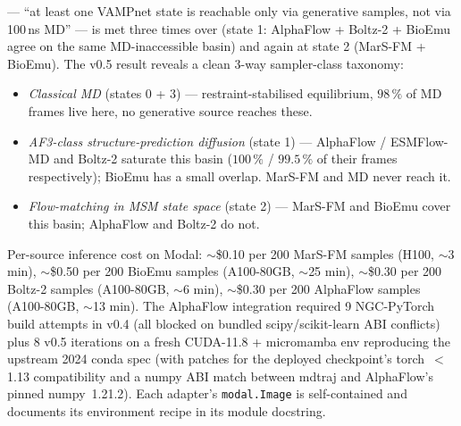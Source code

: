 \documentclass[11pt]{article}
\begin{document}
\begin{enumerate}[leftmargin=*,itemsep=2pt]
        --- ``at least one VAMPnet state is reachable only via
        generative samples, not via 100\,ns MD'' --- is met three
        times over (state 1: AlphaFlow + Boltz-2 + BioEmu agree on the
        same MD-inaccessible basin) and again at state 2 (MarS-FM +
        BioEmu). The v0.5 result reveals a clean 3-way sampler-class
        taxonomy:
        \begin{itemize}[leftmargin=*]
          \item \emph{Classical MD} (states 0 + 3) ---
                restraint-stabilised equilibrium, $98\,\%$ of MD
                frames live here, no generative source reaches these.
          \item \emph{AF3-class structure-prediction diffusion}
                (state 1) --- AlphaFlow / ESMFlow-MD and Boltz-2
                saturate this basin ($100\,\%$ / $99.5\,\%$ of their
                frames respectively); BioEmu has a small overlap.
                MarS-FM and MD never reach it.
          \item \emph{Flow-matching in MSM state space} (state 2) ---
                MarS-FM and BioEmu cover this basin; AlphaFlow and
                Boltz-2 do not.
        \end{itemize}
        Per-source inference cost on Modal: $\sim$\$0.10 per 200
        MarS-FM samples (H100, $\sim$3 min), $\sim$\$0.50 per 200
        BioEmu samples (A100-80GB, $\sim$25 min), $\sim$\$0.30 per
        200 Boltz-2 samples (A100-80GB, $\sim$6 min), $\sim$\$0.30
        per 200 AlphaFlow samples (A100-80GB, $\sim$13 min). The
        AlphaFlow integration required 9 NGC-PyTorch build attempts
        in v0.4 (all blocked on bundled scipy/scikit-learn ABI
        conflicts) plus 8 v0.5 iterations on a fresh CUDA-11.8 +
        micromamba env reproducing the upstream 2024 conda spec
        (with patches for the deployed checkpoint's torch~$<$1.13
        compatibility and a numpy ABI match between mdtraj and
        AlphaFlow's pinned numpy~1.21.2). Each adapter's
        \texttt{modal.Image} is self-contained and documents its
        environment recipe in its module docstring.


\end{enumerate}
\end{document}
